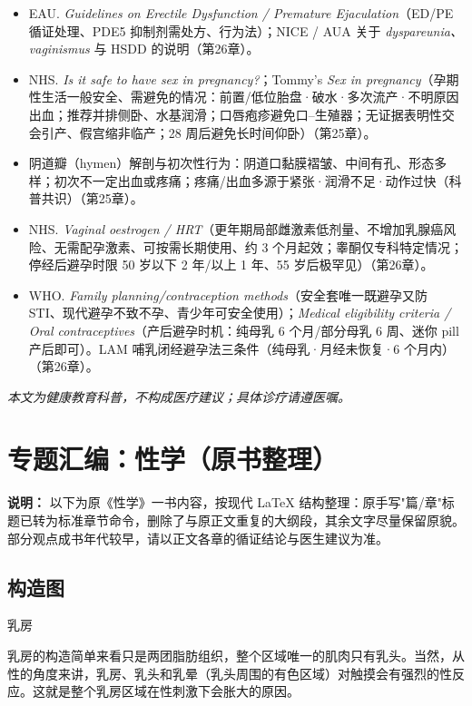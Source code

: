 \documentclass[12pt,UTF8,openany]{ctexbook}
\begin{document}
\begin{itemize}[leftmargin=2em]
  \item EAU. \emph{Guidelines on Erectile Dysfunction / Premature Ejaculation}（ED/PE 循证处理、PDE5 抑制剂需处方、行为法）；NICE / AUA 关于 \emph{dyspareunia、vaginismus} 与 HSDD 的说明（第26章）。
  \item NHS. \emph{Is it safe to have sex in pregnancy?}；Tommy's \emph{Sex in pregnancy}（孕期性生活一般安全、需避免的情况：前置/低位胎盘·破水·多次流产·不明原因出血；推荐并排侧卧、水基润滑；口唇疱疹避免口--生殖器；无证据表明性交会引产、假宫缩非临产；28 周后避免长时间仰卧）（第25章）。
  \item 阴道瓣（hymen）解剖与初次性行为：阴道口黏膜褶皱、中间有孔、形态多样；初次不一定出血或疼痛；疼痛/出血多源于紧张·润滑不足·动作过快（科普共识）（第25章）。
  \item NHS. \emph{Vaginal oestrogen / HRT}（更年期局部雌激素低剂量、不增加乳腺癌风险、无需配孕激素、可按需长期使用、约 3 个月起效；睾酮仅专科特定情况；停经后避孕时限 50 岁以下 2 年/以上 1 年、55 岁后极罕见）（第26章）。
  \item WHO. \emph{Family planning/contraception methods}（安全套唯一既避孕又防 STI、现代避孕不致不孕、青少年可安全使用）；\emph{Medical eligibility criteria / Oral contraceptives}（产后避孕时机：纯母乳 6 个月/部分母乳 6 周、迷你 pill 产后即可）。LAM 哺乳闭经避孕法三条件（纯母乳·月经未恢复·6 个月内）（第26章）。
\end{itemize}

\begin{center}
\itshape 本文为健康教育科普，不构成医疗建议；具体诊疗请遵医嘱。
\end{center}

\clearpage
\part{专题汇编：性学（原书整理）}

\noindent\textbf{说明：} 以下为原《性学》一书内容，按现代 LaTeX 结构整理：原手写"篇/章"标题已转为标准章节命令，删除了与原正文重复的大纲段，其余文字尽量保留原貌。部分观点成书年代较早，请以正文各章的循证结论与医生建议为准。

\chapter{构造图}

乳房

乳房的构造简单来看只是两团脂肪组织，整个区域唯一的肌肉只有乳头。当然，从性的角度来讲，乳房、乳头和乳晕（乳头周围的有色区域）对触摸会有强烈的性反应。这就是整个乳房区域在性刺激下会胀大的原因。
\end{document}

